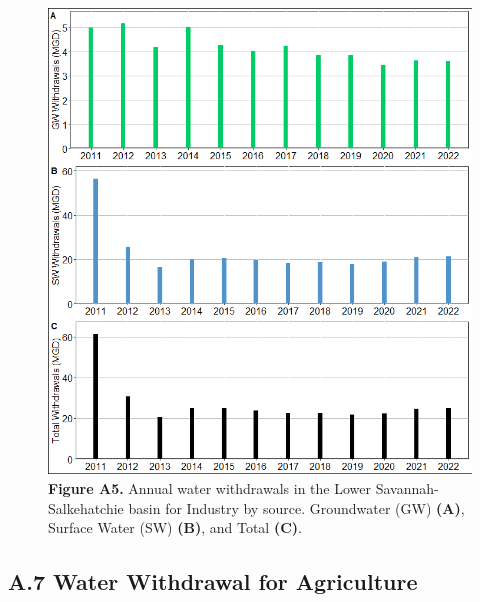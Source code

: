 \documentclass[
]{article}
\begin{document}
\begin{figure}[H]

{\centering \includegraphics{LSS_figures/trend-IN_bar-plot-1} 

}

\caption{\textbf{Figure A5.} Annual water withdrawals in the Lower Savannah-Salkehatchie basin for Industry by source. Groundwater (GW) \textbf{(A)}, Surface Water (SW) \textbf{(B)}, and Total \textbf {(C)}.}\label{fig:trend-IN_bar-plot}
\end{figure}

\hypertarget{a.7-water-withdrawal-for-agriculture}{%
\subsection{A.7 Water Withdrawal for
Agriculture}\label{a.7-water-withdrawal-for-agriculture}}
\end{document}
